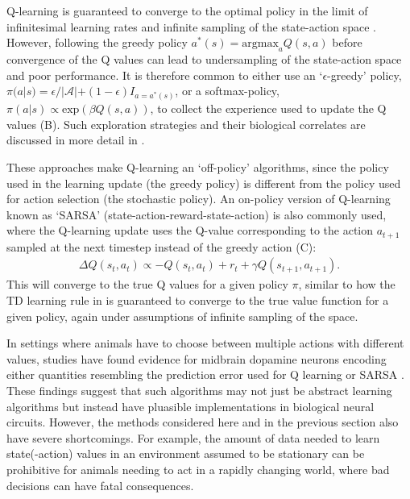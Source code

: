 Q-learning is guaranteed to converge to the optimal policy in the limit of infinitesimal learning rates and infinite sampling of the state-action space \citep{watkins1992q,sutton2018reinforcement}.
However, following the greedy policy $a^*(s) = \text{argmax}_{a} Q(s, a)$ before convergence of the Q values can lead to undersampling of the state-action space and poor performance.
It is therefore common to either use an `$\epsilon$-greedy' policy, $\pi(a|s) = \epsilon / |\mathcal{A}| + (1-\epsilon) I_{a = a^*(s)}$, or a softmax-policy, $\pi(a|s) \propto \text{exp}(\beta Q(s, a))$, to collect the experience used to update the Q values (B).
Such exploration strategies and their biological correlates are discussed in more detail in .

These approaches make Q-learning an `off-policy' algorithms, since the policy used in the learning update (the greedy policy) is different from the policy used for action selection (the stochastic policy).
An on-policy version of Q-learning known as `SARSA' (state-action-reward-state-action) is also commonly used, where the Q-learning update uses the Q-value corresponding to the action $a_{t+1}$ sampled at the next timestep instead of the greedy action (C):
\begin{align}
    \Delta  Q(s_t,a_t) \propto - Q(s_t,a_t) + r_t + \gamma Q(s_{t+1}, a_{t+1}).
\end{align}
This will converge to the true Q values for a given policy $\pi$, similar to how the TD learning rule in  is guaranteed to converge to the true value function for a given policy, again under assumptions of infinite sampling of the space.

In settings where animals have to choose between multiple actions with different values, studies have found evidence for midbrain dopamine neurons encoding either quantities resembling the prediction error used for Q learning \citep{roesch2007dopamine,niv2009reinforcement} or SARSA \citep{morris2006midbrain,niv2009reinforcement}.
These findings suggest that such algorithms may not just be abstract learning algorithms but instead have pluasible implementations in biological neural circuits.
However, the methods considered here and in the previous section also have severe shortcomings.
For example, the amount of data needed to learn state(-action) values in an environment assumed to be stationary can be prohibitive for animals needing to act in a rapidly changing world, where bad decisions can have fatal consequences.

